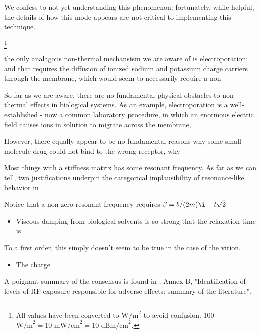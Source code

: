 \documentclass[paper.tex]{subfiles}
\begin{document}
\begin{multicols}{1}
{	We confess to not yet understanding this phenomenon; fortunately, while helpful, the details of how this mode appears are not critical to implementing this technique.}


\footnote{All values have been converted to $\text{W/m}^2$ to avoid confusion. 100 $\text{W/m}^2 = 10 \text{ mW/cm}^2 = 10 \text{ dBm/cm}^2$.}




the only analagous non-thermal mechansism we are aware of is electroporation; and that requires the diffusion of ionized sodium and potassium charge carriers through the membrane, which would seem to necessarily require a non-



So far as we are aware, there are no fundamental physical obstacles to non-thermal effects in biological systems. As an example, electroporation is a well-established - now a common laboratory procedure, in which an enormous electric field causes ions in solution to migrate across the membrane, 

However, there equally appear to be no fundamental reasons why some small-molecule drug could not bind to the wrong receptor, why 



Most things with a stiffness matrix has some resonant frequency\citationneeded. As far as we can tell, two justifications underpin the categorical implausibility of resonance-like behavior in 

Notice that a non-zero resonant frequency
requires $\beta = b/(2m) \i-t \sqrt{2}$ \cite{Driven}


\begin{itemize}
		\item Viscous damping from biological solvents is so strong that the relaxation time is 
\end{itemize}

To a first order, this simply doesn't seem to be true in the case of the virion.

\begin{itemize}
		\item The charge 
\end{itemize}








A poignant summary of the consensus is found in \cite{IEEE2006}, Annex B, "Identification of levels of RF exposure responsible for adverse effects: summary of the literature".


\end{multicols}
\end{document}
